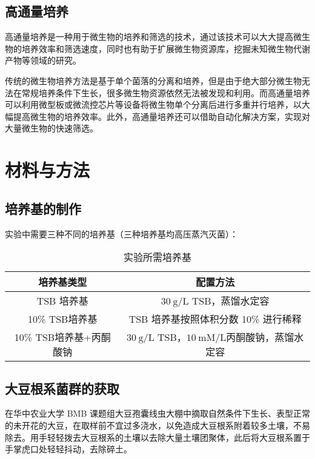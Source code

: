 \documentclass{ctexart}
\begin{document}
    \subsection{高通量培养}

    \qquad 高通量培养是一种用于微生物的培养和筛选的技术，通过该技术可以大大提高微生物的培养效率和筛选速度，同时也有助于扩展微生物资源库，挖掘未知微生物代谢产物等领域的研究。
    
    \qquad 传统的微生物培养方法是基于单个菌落的分离和培养，但是由于绝大部分微生物无法在常规培养条件下生长，很多微生物资源依然无法被发现和利用。而高通量培养可以利用微型板或微流控芯片等设备将微生物单个分离后进行多重并行培养，以大幅提高微生物的培养效率。此外，高通量培养还可以借助自动化解决方案，实现对大量微生物的快速筛选。
    

    \section{材料与方法}

    \subsection{培养基的制作}

        实验中需要三种不同的培养基（三种培养基均高压蒸汽灭菌）：

    \begin{table}[htb]
        \caption{实验所需培养基}
        \centering
        \begin{tabular}{cc}
            \toprule
            培养基类型 & 配置方法\\
            \midrule
            TSB 培养基 & $\mathrm{30~g/L}$ TSB，蒸馏水定容\\
            10\% TSB培养基 & TSB 培养基按照体积分数 10\% 进行稀释\\
            10\% TSB培养基+丙酮酸钠 & $\mathrm{30~g/L}$ TSB，$\mathrm{10~mM/L} $丙酮酸钠，蒸馏水定容\\
            \bottomrule
        \end{tabular}
    \end{table}

    \subsection{大豆根系菌群的获取}

    \qquad 在华中农业大学 BMB 课题组大豆孢囊线虫大棚中摘取自然条件下生长、表型正常的未开花的大豆，在取样前不宜过多浇水，以免造成大豆根系附着较多土壤，不易除去。用手轻轻拨去大豆根系的土壤以去除大量土壤团聚体，此后将大豆根系置于手掌虎口处轻轻抖动，去除碎土。
\end{document}
